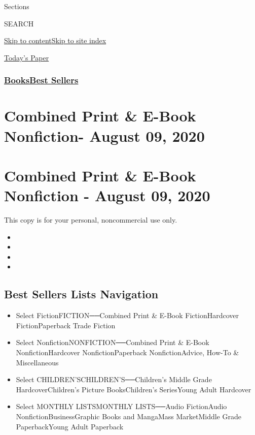 Sections

SEARCH

\protect\hyperlink{site-content}{Skip to
content}\protect\hyperlink{site-index}{Skip to site index}

\href{https://myaccount.nytimes3xbfgragh.onion/auth/login?response_type=cookie\&client_id=vi}{}

\href{https://www.nytimes3xbfgragh.onion/section/todayspaper}{Today's
Paper}

\hypertarget{booksbest-sellers}{%
\subsubsection{\texorpdfstring{\href{/section/books/}{Books}\textbar{}\href{/books/best-sellers/}{Best
Sellers}}{Books\textbar{}Best Sellers}}\label{booksbest-sellers}}

\hypertarget{combined-print--e-book-nonfiction--august-09-2020}{%
\section{Combined Print \& E-Book Nonfiction- August 09,
2020}\label{combined-print--e-book-nonfiction--august-09-2020}}

\hypertarget{combined-print--e-book-nonfiction---august-09-2020}{%
\section{Combined Print \& E-Book Nonfiction - August 09,
2020}\label{combined-print--e-book-nonfiction---august-09-2020}}

This copy is for your personal, noncommercial use only.

\begin{itemize}
\item
\item
\item
\item
\end{itemize}

\hypertarget{best-sellers-lists-navigation}{%
\subsection{Best Sellers Lists
Navigation}\label{best-sellers-lists-navigation}}

\begin{itemize}
\tightlist
\item
  Select FictionFICTION──Combined Print \& E-Book FictionHardcover
  FictionPaperback Trade Fiction
\item
  Select NonfictionNONFICTION──Combined Print \& E-Book
  NonfictionHardcover NonfictionPaperback NonfictionAdvice, How-To \&
  Miscellaneous
\item
  Select CHILDREN'SCHILDREN'S──Children's Middle Grade
  HardcoverChildren's Picture BooksChildren's SeriesYoung Adult
  Hardcover
\item
  Select MONTHLY LISTSMONTHLY LISTS──Audio FictionAudio
  NonfictionBusinessGraphic Books and MangaMass MarketMiddle Grade
  PaperbackYoung Adult Paperback
\end{itemize}

